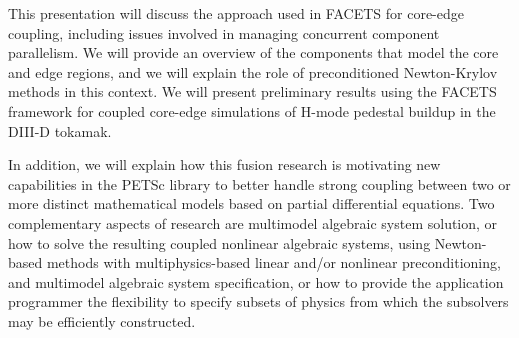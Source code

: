 \documentclass{report}
\begin{document}
This presentation will discuss the approach used in FACETS for core-edge
coupling, including issues involved in managing concurrent component
parallelism. We will provide an overview of the components that model the
core and edge regions, and we will explain the role of preconditioned
Newton-Krylov methods in this context. We will present preliminary
results using the FACETS framework for coupled core-edge simulations of
H-mode pedestal buildup in the DIII-D tokamak.

In addition, we will explain how this fusion research is motivating new
capabilities in the PETSc library to better handle strong coupling
between two or more distinct mathematical models based on partial
differential equations. Two complementary aspects of research are
multimodel algebraic system solution, or how to solve the resulting
coupled nonlinear algebraic systems, using Newton-based methods with
multiphysics-based linear and/or nonlinear preconditioning, and
multimodel algebraic system specification, or how to provide the
application programmer the flexibility to specify subsets of physics from
which the subsolvers may be efficiently constructed.
\end{document}

